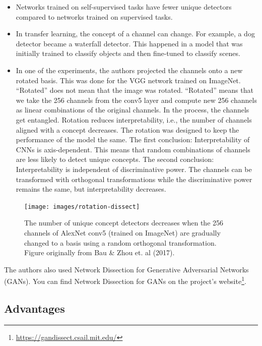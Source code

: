 \documentclass[
  12pt,
]{krantz}
\providecommand{\tightlist}{%
  \setlength{\itemsep}{0pt}\setlength{\parskip}{0pt}}
\renewcommand{\href}[2]{#2\footnote{\url{#1}}}
\begin{document}
\begin{itemize}
\tightlist
\item
  Networks trained on self-supervised tasks have fewer unique detectors compared to networks trained on supervised tasks.
\item
  In transfer learning, the concept of a channel can change. For example, a dog detector became a waterfall detector. This happened in a model that was initially trained to classify objects and then fine-tuned to classify scenes.
\item
  In one of the experiments, the authors projected the channels onto a new rotated basis.
  This was done for the VGG network trained on ImageNet.
  ``Rotated'' does not mean that the image was rotated.
  ``Rotated'' means that we take the 256 channels from the conv5 layer and compute new 256 channels as linear combinations of the original channels.
  In the process, the channels get entangled.
  Rotation reduces interpretability, i.e., the number of channels aligned with a concept decreases.
  The rotation was designed to keep the performance of the model the same.
  The first conclusion:
  Interpretability of CNNs is axis-dependent.
  This means that random combinations of channels are less likely to detect unique concepts.
  The second conclusion:
  Interpretability is independent of discriminative power.
  The channels can be transformed with orthogonal transformations while the discriminative power remains the same, but interpretability decreases.
\end{itemize}

\begin{figure}

{\centering \texttt{[image: images/rotation-dissect]} 

}

\caption{The number of unique concept detectors decreases when the 256 channels of AlexNet conv5 (trained on ImageNet) are gradually changed to a basis using a random orthogonal transformation. Figure originally from Bau \& Zhou et. al (2017).}\label{fig:unnamed-chunk-59}
\end{figure}

The authors also used Network Dissection for Generative Adversarial Networks (GANs).
You can find Network Dissection for GANs on \href{https://gandissect.csail.mit.edu/}{the project's website}.

\hypertarget{advantages-18}{%
\subsection{Advantages}\label{advantages-18}}
\end{document}
